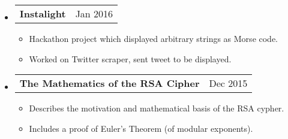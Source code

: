 \documentclass[18pt]{article}
\makeatletter
\providecommand{\tightlist}{
    \setlength{\itemsep}{0pt}\setlength{\parskip}{0pt}
}
\providecommand{\datetable}[2]{
    \begin{tabular*}{\textwidth}{@{}r @{\extracolsep{\fill}} l}
        #1 & #2
    \end{tabular*}
}
\makeatother
\begin{document}
\begin{itemize}[label={}]
      
            
        \item \datetable{\textbf{Instalight}}{Jan 2016}
        \begin{itemize}\tightlist
            \item Hackathon project which displayed arbitrary strings as Morse code.
            \item Worked on Twitter scraper, sent tweet to be displayed.
        \end{itemize}
        
        \item \datetable{\textbf{The Mathematics of the RSA Cipher}}{Dec 2015}
        \begin{itemize}\tightlist
            \item Describes the motivation and mathematical basis of the RSA cypher.
            \item Includes a proof of Euler's Theorem (of modular exponents).
        \end{itemize}
  \end{itemize}
    
\end{document}
